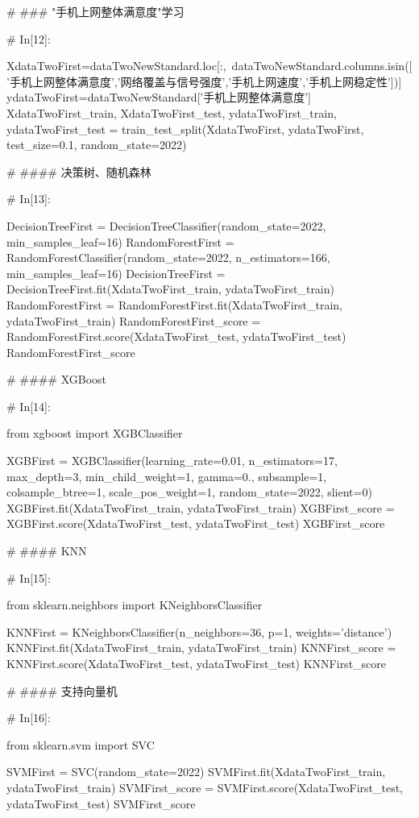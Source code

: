 \documentclass{MathorCupmodeling}
\begin{document}
\begin{python}
# ### "手机上网整体满意度"学习

# In[12]:


XdataTwoFirst=dataTwoNewStandard.loc[:,~dataTwoNewStandard.columns.isin(['手机上网整体满意度','网络覆盖与信号强度','手机上网速度','手机上网稳定性'])]
ydataTwoFirst=dataTwoNewStandard['手机上网整体满意度']
XdataTwoFirst_train, XdataTwoFirst_test, ydataTwoFirst_train, ydataTwoFirst_test = train_test_split(XdataTwoFirst, ydataTwoFirst, test_size=0.1, random_state=2022)


# #### 决策树、随机森林

# In[13]:


DecisionTreeFirst = DecisionTreeClassifier(random_state=2022, min_samples_leaf=16)
RandomForestFirst = RandomForestClassifier(random_state=2022, n_estimators=166, min_samples_leaf=16)
DecisionTreeFirst = DecisionTreeFirst.fit(XdataTwoFirst_train, ydataTwoFirst_train)
RandomForestFirst = RandomForestFirst.fit(XdataTwoFirst_train, ydataTwoFirst_train)
RandomForestFirst_score = RandomForestFirst.score(XdataTwoFirst_test, ydataTwoFirst_test)
RandomForestFirst_score


# #### XGBoost

# In[14]:


from xgboost import XGBClassifier

XGBFirst = XGBClassifier(learning_rate=0.01,
                         n_estimators=17,
                         max_depth=3,
                         min_child_weight=1,
                         gamma=0.,
                         subsample=1,
                         colsample_btree=1,
                         scale_pos_weight=1,
                         random_state=2022,
                         slient=0)
XGBFirst.fit(XdataTwoFirst_train, ydataTwoFirst_train)
XGBFirst_score = XGBFirst.score(XdataTwoFirst_test, ydataTwoFirst_test)
XGBFirst_score


# #### KNN

# In[15]:


from sklearn.neighbors import KNeighborsClassifier

KNNFirst = KNeighborsClassifier(n_neighbors=36, p=1, weights='distance')
KNNFirst.fit(XdataTwoFirst_train, ydataTwoFirst_train)
KNNFirst_score = KNNFirst.score(XdataTwoFirst_test, ydataTwoFirst_test)
KNNFirst_score


# #### 支持向量机

# In[16]:


from sklearn.svm import SVC

SVMFirst = SVC(random_state=2022)
SVMFirst.fit(XdataTwoFirst_train, ydataTwoFirst_train)
SVMFirst_score = SVMFirst.score(XdataTwoFirst_test, ydataTwoFirst_test)
SVMFirst_score



\end{python}
\end{document}
